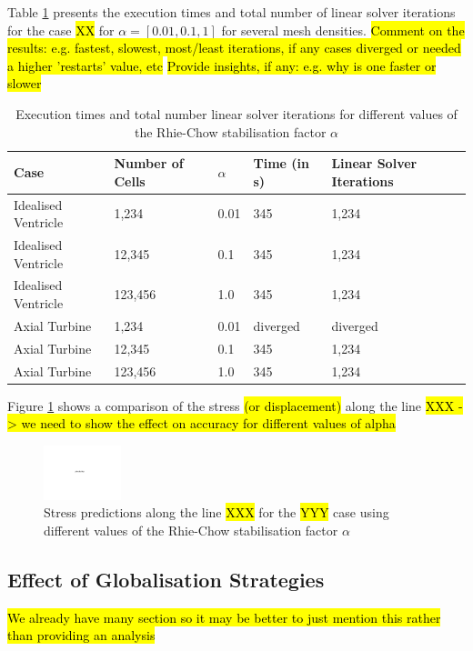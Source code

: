 \documentclass[sn-mathphys,Numbered]{sn-jnl}%
\begin{document}
Table \ref{tab:rhie_chow} presents the execution times and total number of linear solver iterations for the case \hl{XX} for $\alpha = \left[ 0.01, 0.1, 1 \right]$ for several mesh densities.
\hl{Comment on the results: e.g. fastest, slowest, most/least iterations, if any cases diverged or needed a higher 'restarts' value, etc}
\hl{Provide insights, if any: e.g. why is one faster or slower}
\begin{table}[htb]
	\centering
		\begin{tabular}{lllll}
			\hline
			Case & Number of Cells & $\alpha$ & Time (in s) & Linear Solver Iterations  \\
			\hline 
			Idealised Ventricle & 1,234 & 0.01 & 345 & 1,234  \\
			Idealised Ventricle & 12,345 & 0.1 & 345 & 1,234  \\
			Idealised Ventricle & 123,456 & 1.0 & 345 & 1,234  \\
			Axial Turbine & 1,234 & 0.01 & diverged & diverged  \\
			Axial Turbine & 12,345 & 0.1 & 345 & 1,234  \\
			Axial Turbine & 123,456 & 1.0 & 345 & 1,234  \\
			\hline
		\end{tabular}
	\caption{Execution times and total number linear solver iterations for different values of the Rhie-Chow stabilisation factor $\alpha$}
	\label{tab:rhie_chow}
\end{table}

Figure \ref{fig:rhie_chow} shows a comparison of the stress \hl{(or displacement)} along the line \hl{XXX -> we need to show the effect on accuracy for different values of alpha}
\begin{figure}[htbp]
   \centering
   \includegraphics[width=0.2\textwidth]{figures/placeholder.pdf} 
   \caption{Stress predictions along the line \hl{XXX} for the \hl{YYY} case using different values of the Rhie-Chow stabilisation factor $\alpha$}
   \label{fig:rhie_chow}
\end{figure}


\subsection{Effect of Globalisation Strategies}
\hl{We already have many section so it may be better to just mention this rather than providing an analysis}
\end{document}
